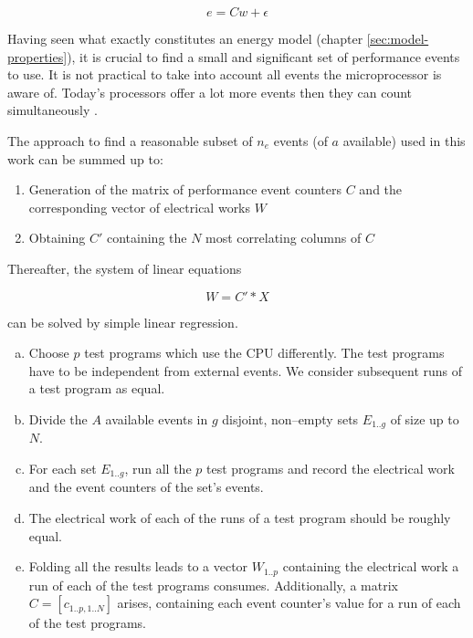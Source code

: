 \begin{equation}
e = C w + \epsilon
\end{equation}

\label{sec:min-events}

Having seen what exactly constitutes an energy model (chapter
\ref{sec:model-properties}), it is crucial to find a small and significant set
of performance events to use. It is not practical to take into account all
events the microprocessor is aware of. Today's processors offer a lot more
events then they can count simultaneously \cite{intel2011softdev1}.

The approach to find a reasonable subset of $n_e$ events (of $a$ available)
used in this work can be summed up to:

\begin{enumerate}

\item Generation of the matrix of performance event counters $C$ and
the corresponding vector of electrical works $W$

\item Obtaining $C'$ containing the $N$ most correlating columns of $C$

\end{enumerate}

Thereafter, the system of linear equations

\begin{equation}
W = C' * X
\end{equation}

can be solved by simple linear regression.



\begin{enumerate}[(a)]

\item Choose $p$ test programs which use the CPU differently. The test
programs have to be independent from external events. We consider subsequent
runs of a test program as equal.

\item Divide the $A$ available events in $g$ disjoint, non--empty sets
$E_{1..g}$ of size up to $N$.

\item For each set $E_{1..g}$, run all the $p$ test programs and record the
electrical work and the event counters of the set's events.

\item The electrical work of each of the runs of a test program should be
roughly equal.

\item Folding all the results leads to a vector $W_{1..p}$ containing the
electrical work a run of each of the test programs consumes. Additionally, a
matrix $C = [c_{1..p,1..N}]$ arises, containing each event counter's value for a
run of each of the test programs.

\end{enumerate}

